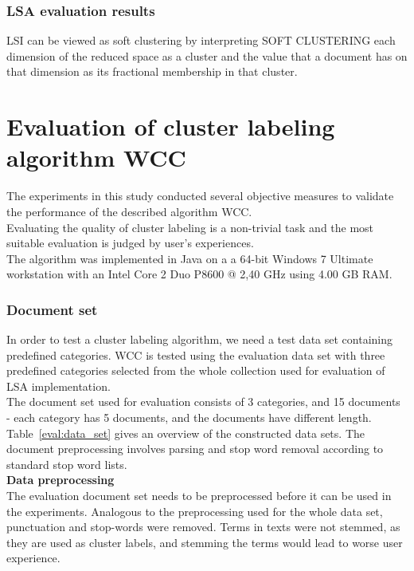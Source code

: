 \subsubsection{LSA evaluation results}
LSI can be viewed as soft clustering by interpreting SOFT CLUSTERING each dimension of the
reduced space as a cluster and the value that a document has on that dimension
as its fractional membership in that cluster. \\


\section{Evaluation of cluster labeling algorithm WCC}

The experiments in this study conducted several objective measures to validate the performance of the described algorithm \gls{WCC}. \\

Evaluating the quality of cluster labeling is a non-trivial task and the most suitable evaluation is judged by user's experiences. \\

The algorithm was implemented in Java on a a 64-bit Windows 7 Ultimate workstation with an Intel Core 2 Duo P8600 @ 2,40 GHz using 4.00 GB RAM. \\

\subsubsection{Document set}
In order to test a cluster labeling algorithm, we need a test data set containing predefined categories. \gls{WCC} is tested using the evaluation data set with three predefined categories selected from the whole collection used for evaluation of \gls{LSA} implementation. \\
 

The document set used for evaluation consists of 3 categories, and 15 documents - each category has 5 documents, and the documents have different length. Table~\ref{eval:data_set} gives an overview of the constructed data sets. The document preprocessing involves parsing and stop word removal according to standard stop word lists. \\


\textbf{Data preprocessing} \\
The evaluation document set needs to be preprocessed before it can be used in the experiments. Analogous to the preprocessing used for the whole data set, punctuation and stop-words were removed. Terms in texts were not stemmed, as they are used as cluster labels, and stemming the terms would lead to worse user experience. \\

